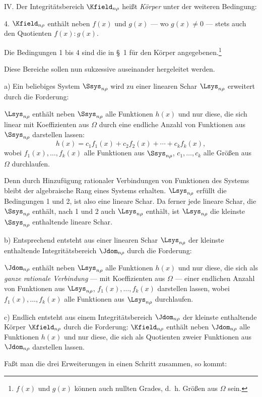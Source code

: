 \documentclass[11pt]{article}
\begin{document}
IV. Der Integritätsbereich $\Kfield_{n\rho}$ heißt \emph{Körper} unter der weiteren Bedingung:

4. $\Kfield_{n\rho}$ enthält neben $f(x)$ und $g(x)$ --- wo $g(x)\ne0$ --- stets auch den Quotienten $f(x):g(x)$.

Die Bedingungen 1 bis 4 sind die in \S\ 1 für den Körper angegebenen.\footnote{$f(x)$ und $g(x)$ können auch nullten Grades, d.~h. Größen aus $\Omega$ sein.}

Diese Bereiche sollen nun sukzessive auseinander hergeleitet werden.

a) Ein beliebiges System $\Ssys_{n\rho}$ wird zu einer linearen Schar $\Lsys_{n\rho}$ erweitert durch die Forderung:

$\Lsys_{n\rho}$ enthält neben $\Ssys_{n\rho}$ alle Funktionen $h(x)$ und nur diese, die sich linear mit Koeffizienten aus $\Omega$ durch eine endliche Anzahl von Funktionen aus $\Ssys_{n\rho}$ darstellen lassen:
\[
  h(x)=c_1f_1(x)+c_2f_2(x)+\cdots+c_kf_k(x),
\]
wobei $f_1(x),\ldots,f_k(x)$ alle Funktionen aus $\Ssys_{n\rho}$, $c_1,
\ldots,c_k$ alle Größen aus $\Omega$ durchlaufen.

Denn durch Hinzufügung rationaler Verbindungen von Funktionen des Systems bleibt der algebraische Rang eines Systems erhalten. $\Lsys_{n\rho}$ erfüllt die Bedingungen 1 und 2, ist also eine lineare Schar. Da ferner jede lineare Schar, die $\Ssys_{n\rho}$ enthält, nach 1 und 2 auch $\Lsys_{n\rho}$ enthält, ist $\Lsys_{n\rho}$ die kleinste $\Ssys_{n\rho}$ enthaltende lineare Schar.

b) Entsprechend entsteht aus einer linearen Schar $\Lsys_{n\rho}$ der kleinste enthaltende Integritätsbereich $\Jdom_{n\rho}$ durch die Forderung:

$\Jdom_{n\rho}$ enthält neben $\Lsys_{n\rho}$ alle Funktionen $h(x)$ und nur diese, die sich als \emph{ganze rationale Verbindung} --- mit Koeffizienten aus $\Omega$ --- einer endlichen Anzahl von Funktionen aus $\Lsys_{n\rho}$, $f_1(x),\ldots,f_k(x)$ darstellen lassen, wobei $f_1(x),\ldots,f_k(x)$ alle Funktionen aus $\Lsys_{n\rho}$ durchlaufen.

c) Endlich entsteht aus einem Integritätsbereich $\Jdom_{n\rho}$ der kleinste enthaltende Körper $\Kfield_{n\rho}$ durch die Forderung: $\Kfield_{n\rho}$ enthält neben $\Jdom_{n\rho}$ alle Funktionen $h(x)$ und nur diese, die sich als Quotienten zweier Funktionen aus $\Jdom_{n\rho}$ darstellen lassen.

Faßt man die drei Erweiterungen in einen Schritt zusammen, so kommt:
\end{document}
